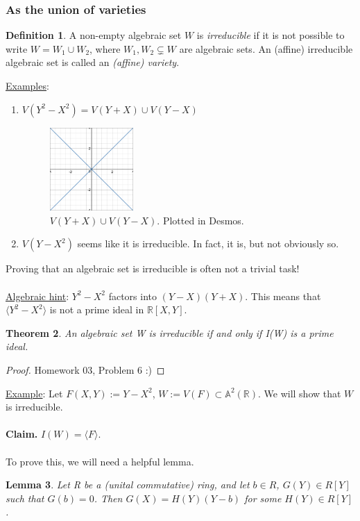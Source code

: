 \documentclass[12pt]{article}
\newcommand{\real}{\mathbb{R}}
\newcommand{\ita}[1]{\textit{#1}}
\newcommand{\vbrack}[1]{\langle #1\rangle}
\newtheorem{theorem}{Theorem}[section]
\newtheorem{lemma}[theorem]{Lemma}
\theoremstyle{definition}
\newtheorem{definition}[theorem]{Definition}
\begin{document}
\subsubsection{As the union of varieties}
\begin{definition}
    A non-empty algebraic set $W$ is \ita{irreducible} if it is not possible to write $W=W_1\cup W_2$, where $W_1,W_2\subsetneq W$ are algebraic sets. An (affine) irreducible algebraic set is called an \ita{(affine) variety}.
\end{definition}
\underline{Examples}: 
\begin{enumerate}
    \item $V(Y^2-X^2)=V(Y+X)\cup V(Y-X)$
    \begin{figure}[H]
        \centering
        \includegraphics[width=0.3\textwidth]{9.png}
        \caption{$V(Y+X)\cup V(Y-X)$. Plotted in Desmos.}
    \end{figure}
    \item $V(Y-X^2)$ seems like it is irreducible. In fact, it is, but not obviously so.
\end{enumerate}
Proving that an algebraic set is irreducible is often not a trivial task!\\\\
\underline{Algebraic hint}: $Y^2-X^2$ factors into $(Y-X)(Y+X)$. This means that $\vbrack{Y^2-X^2}$ is not a prime ideal in $\real[X,Y]$.
\begin{theorem}
    An algebraic set W is irreducible if and only if I(W) is a prime ideal.
\end{theorem}
\begin{proof}
    Homework 03, Problem 6 :)
\end{proof}
\underline{Example}: Let $F(X,Y):=Y-X^2$, $W:=V(F)\subset\mathbb{A}^2(\real)$. We will show that $W$ is irreducible.\\\\
\textbf{Claim.} $I(W)=\vbrack{F}$.\\\\
To prove this, we will need a helpful lemma.
\begin{lemma}
    Let R be a (unital commutative) ring, and let $b\in R$, $G(Y)\in R[Y]$ such that $G(b)=0$. Then $G(X)=H(Y)(Y-b)$ for some $H(Y)\in R[Y]$.
\end{lemma}
\end{document}
